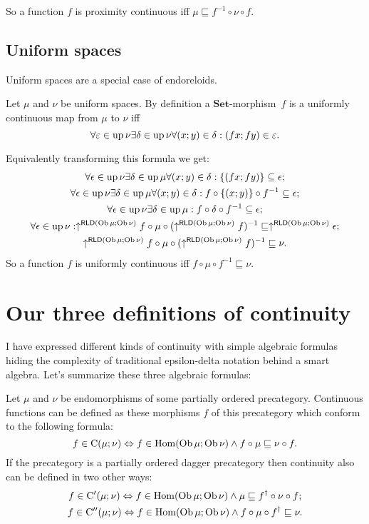 So a function $f$ is proximity continuous iff $\mu\sqsubseteq f^{-1}\circ\nu\circ f$.


\subsection{Uniform spaces}

Uniform spaces are a special case of endoreloids.

Let $\mu$ and $\nu$ be uniform spaces. By definition a $\mathbf{Set}$-morphism~$f$
is a uniformly continuous map from $\mu$ to $\nu$ iff 
\[
\forall\varepsilon\in\operatorname{up}\nu\exists\delta\in\operatorname{up}\nu\forall(x;y)\in\delta:(fx;fy)\in\varepsilon.
\]


Equivalently transforming this formula we get:
\begin{gather*}
\forall\epsilon\in\operatorname{up}\nu\exists\delta\in\operatorname{up}\mu\forall(x;y)\in\delta:\{(fx;fy)\}\subseteq\epsilon;\\
\forall\epsilon\in\operatorname{up}\nu\exists\delta\in\operatorname{up}\mu\forall(x;y)\in\delta:f\circ\{(x;y)\}\circ f^{-1}\subseteq\epsilon;\\
\forall\epsilon\in\operatorname{up}\nu\exists\delta\in\operatorname{up}\mu:f\circ\delta\circ f^{-1}\subseteq\epsilon;\\
\forall\epsilon\in\operatorname{up}\nu:\uparrow^{\mathsf{RLD}(\operatorname{Ob}\mu;\operatorname{Ob}\nu)}f\circ\mu\circ(\uparrow^{\mathsf{RLD}(\operatorname{Ob}\mu;\operatorname{Ob}\nu)}f)^{-1}\sqsubseteq\uparrow^{\mathsf{RLD}(\operatorname{Ob}\mu;\operatorname{Ob}\nu)}\epsilon;\\
\uparrow^{\mathsf{RLD}(\operatorname{Ob}\mu;\operatorname{Ob}\nu)}f\circ\mu\circ(\uparrow^{\mathsf{RLD}(\operatorname{Ob}\mu;\operatorname{Ob}\nu)}f)^{-1}\sqsubseteq\nu.
\end{gather*}
So a function $f$ is uniformly continuous iff $f\circ\mu\circ f^{-1}\sqsubseteq\nu$.


\section{Our three definitions of continuity}

I have expressed different kinds of continuity with simple algebraic
formulas hiding the complexity of traditional epsilon-delta notation
behind a smart algebra. Let's summarize these three algebraic formulas:

Let $\mu$ and $\nu$ be endomorphisms of some partially ordered precategory.
Continuous functions can be defined as these morphisms $f$ of this
precategory which conform to the following formula:
\[
f\in\mathrm{C}(\mu;\nu)\Leftrightarrow f\in\operatorname{Hom}(\operatorname{Ob}\mu;\operatorname{Ob}\nu)\land f\circ\mu\sqsubseteq\nu\circ f.
\]
If the precategory is a partially ordered dagger precategory then
continuity also can be defined in two other ways:
\begin{gather*}
f\in\mathrm{C}'(\mu;\nu)\Leftrightarrow f\in\operatorname{Hom}(\operatorname{Ob}\mu;\operatorname{Ob}\nu)\land\mu\sqsubseteq f^{\dagger}\circ\nu\circ f;\\
f\in\mathrm{C}''(\mu;\nu)\Leftrightarrow f\in\operatorname{Hom}(\operatorname{Ob}\mu;\operatorname{Ob}\nu)\land f\circ\mu\circ f^{\dagger}\sqsubseteq\nu.
\end{gather*}

